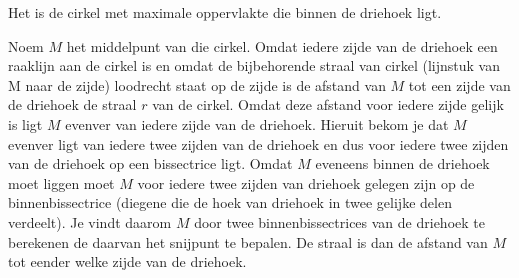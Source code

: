 \begin{voorbeeld}
\begin{center}
\begin{tikzpicture}
	\end{tikzpicture}
\end{center}


Het is de cirkel met maximale oppervlakte die binnen de driehoek ligt.

Noem $M$ het middelpunt van die cirkel.
Omdat iedere zijde van de driehoek een raaklijn aan de cirkel is en omdat de bijbehorende straal van cirkel (lijnstuk van M naar de zijde) loodrecht staat op de zijde is de afstand van $M$ tot een zijde van de driehoek de straal $r$ van de cirkel.
Omdat deze afstand voor iedere zijde gelijk is ligt $M$ evenver van iedere zijde van de driehoek.
Hieruit bekom je dat $M$ evenver ligt van iedere twee zijden van de driehoek en dus voor iedere twee zijden van de driehoek op een bissectrice ligt.
Omdat $M$ eveneens binnen de driehoek moet liggen moet $M$ voor iedere twee zijden van driehoek gelegen zijn op de binnenbissectrice (diegene die de hoek van driehoek in twee gelijke delen verdeelt).
Je vindt daarom $M$ door twee binnenbissectrices van de driehoek te berekenen de daarvan het snijpunt te bepalen.
De straal is dan de afstand van $M$ tot eender welke zijde van de driehoek.\\

\end{voorbeeld}

